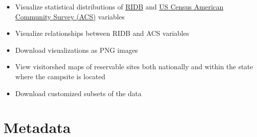 \documentclass[
  11 pt,
  openany]{book}
\providecommand{\tightlist}{%
  \setlength{\itemsep}{0pt}\setlength{\parskip}{0pt}}
\begin{document}
\begin{itemize}
\tightlist
\item
  Visualize statistical distributions of \href{https://ridb.recreation.gov/download}{RIDB} and \href{https://www.census.gov/programs-surveys/acs/data.html}{US Census American Community Survey (ACS)} variables
\item
  Visualize relationships between RIDB and ACS variables
\item
  Download visualizations as PNG images
\item
  View visitorshed maps of reservable sites both nationally and within the state where the campsite is located
\item
  Download customized subsets of the data
\end{itemize}

\hypertarget{metadata}{%
\section{Metadata}\label{metadata}}
\end{document}
